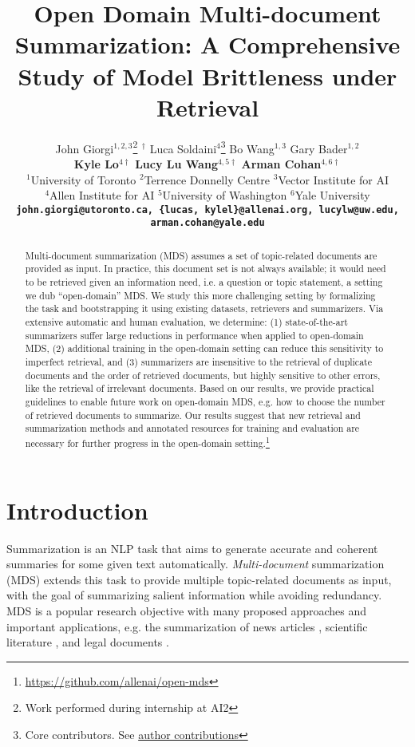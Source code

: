 \documentclass[11pt]{article}
\title{Open Domain Multi-document Summarization: A Comprehensive Study of Model Brittleness under Retrieval}
\author{
John Giorgi$^{1,2,3}$\thanks{\enspace Work performed during internship at AI2}$^{\;\;\dag}$ \quad Luca Soldaini$^{4}$\thanks{\enspace Core contributors. See \hyperref[sec:contrib]{author contributions}} \quad Bo Wang$^{1,3}$ \quad Gary Bader$^{1,2}$ \\ \textbf{Kyle Lo}$^{4\dag}$ \quad \textbf{Lucy Lu Wang}$^{4,5\dag}$ \quad \textbf{Arman Cohan}$^{4,6\dag}$\vspace{6pt}\\
  $^{1}$University of Toronto \quad
  $^{2}$Terrence Donnelly Centre \quad
  $^{3}$Vector Institute for AI \\
  $^{4}$Allen Institute for AI \quad
  $^{5}$University of Washington \quad $^{6}$Yale University\\
  {\footnotesize \bf\texttt{john.giorgi@utoronto.ca, \{lucas, kylel\}@allenai.org, lucylw@uw.edu, arman.cohan@yale.edu}}
}
\begin{document}
\maketitle
\begin{abstract}
Multi-document summarization (MDS) assumes a set of topic-related documents are provided as input. In practice, this document set is not always available; it would need to be retrieved given an information need, i.e. a question or topic statement, a setting we dub ``open-domain'' MDS. We study this more challenging setting by formalizing the task and bootstrapping it using existing datasets, retrievers and summarizers. Via extensive automatic and human evaluation, we determine: (1) state-of-the-art summarizers suffer large reductions in performance when applied to open-domain MDS, (2) additional training in the open-domain setting can reduce this sensitivity to imperfect retrieval, and (3) summarizers are insensitive to the retrieval of duplicate documents and the order of retrieved documents, but highly sensitive to other errors, like the retrieval of irrelevant documents. Based on our results, we provide practical guidelines to enable future work on open-domain MDS, e.g. how to choose the number of retrieved documents to summarize. Our results suggest that new retrieval and summarization methods and annotated resources for training and evaluation are necessary for further progress in the open-domain setting.\footnote{\label{footurl}\url{https://github.com/allenai/open-mds}}
\end{abstract}

\section{Introduction}

Summarization is an NLP task that aims to generate accurate and coherent summaries for some given text automatically. \textit{Multi-document} summarization (MDS) extends this task to provide multiple topic-related documents as input, with the goal of summarizing salient information while avoiding redundancy. MDS is a popular research objective with many proposed approaches \citep{yasunaga-etal-2017-graph, liao-etal-2018-abstract, liu-lapata-2019-hierarchical, li-etal-2020-leveraging-graph, jin-etal-2020-multi, mao-etal-2020-multi, pegasus, pasunuru-etal-2021-efficiently, xiao-etal-2022-primera} and important applications, e.g. the summarization of news articles \citep{fabbri-etal-2019-multi, gholipour-ghalandari-etal-2020-large}, scientific literature \citep{lu-etal-2020-multi-xscience, cochrane, deyoung-etal-2021-ms}, and legal documents \citep{multilexsum}.
\end{document}
